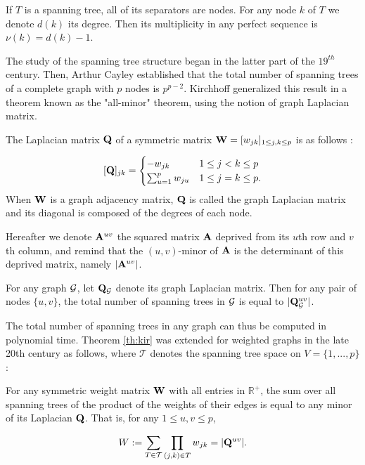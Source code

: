 \begin{prop}
If $T$ is a spanning tree, all of its separators are nodes. For any node $k$ of $T$ we denote $d(k)$ its degree. Then its multiplicity in any perfect sequence is $\nu(k) = d(k)-1$.
\end{prop}
 
 
 The study of the spanning tree structure began in the latter part of the $19^{th}$ century. Then, Arthur Cayley established that the total number of spanning trees of a complete graph with $p$ nodes is $p^{p-2}$. Kirchhoff generalized this result in a theorem known as the "all-minor" theorem, using the notion of graph Laplacian matrix.
  \begin{definition}
 \label{laplacian}
 The Laplacian matrix ${\bf Q}$ of a symmetric matrix ${\bf W}=[w_{jk} ]_{1\leq j,k\leq p}$ is as follows :

\[
 [{\bf Q}]_{jk}  =\begin{cases}
    -w_{jk}  & 1\leq j<k \leq p\\
    \sum_{u=1}^p w_{ju} & 1\leq j=k \leq p.
    \end{cases}
\]
When ${\bf W}$ is a graph adjacency matrix, ${\bf Q}$ is called the graph Laplacian matrix and its diagonal is composed of the degrees of each node.
 \end{definition}
 
 Hereafter we denote ${\bf A}^{uv}$ the squared matrix ${\bf A}$ deprived from its $u$th row and $v$th column, and remind that the $(u, v)$-minor of ${\bf A}$ is the determinant of this deprived matrix, namely $|{\bf A}^{uv}|$.
 
 \begin{theorem}\label{th:kir}
 For any graph $\mathcal{G}$, let  ${\bf Q}_{\mathcal{G}}$ denote its graph Laplacian matrix. Then for any  pair of nodes $\{u,v\}$, the total number of spanning trees in $\mathcal{G}$ is equal to  $|{\bf Q}_{\mathcal{G}}^{uv}|$.
\end{theorem}  

 
The total number of spanning trees in any graph can thus be computed in polynomial time. Theorem \ref{th:kir} was extended for weighted graphs in the late 20th century as follows, where $\mathcal{T}$ denotes the spanning tree space on $V=\{1,...,p\}$:

\begin{theorem} \label{thmm:MTT}
    For any symmetric weight matrix ${\bf W}$ with all entries in $\mathds{R}^+$, the sum over all spanning trees of the product of the weights of their edges is equal to any minor of its Laplacian ${\bf Q}$. That is, for any $1 \leq u, v \leq p$,
 
   \[
    W := \sum_{T\in\mathcal{T}} \prod_{(j, k)\in T} w_{jk} = |{\bf Q}^{uv}|.
    \]
   
\end{theorem}    

